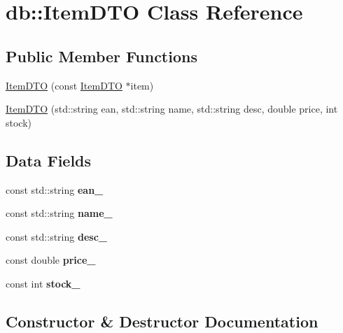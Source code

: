 \hypertarget{classdb_1_1ItemDTO}{}\section{db\+:\+:Item\+D\+TO Class Reference}
\label{classdb_1_1ItemDTO}
\subsection*{Public Member Functions}
\begin{DoxyCompactItemize}
\item 
\mbox{\hyperlink{classdb_1_1ItemDTO_a93543079a408eedb1978d0faad80a39d}{Item\+D\+TO}} (const \mbox{\hyperlink{classdb_1_1ItemDTO}{Item\+D\+TO}} $\ast$item)
\item 
\mbox{\hyperlink{classdb_1_1ItemDTO_a0769007cb2c7fa59e9cd61b577a3129c}{Item\+D\+TO}} (std\+::string ean, std\+::string name, std\+::string desc, double price, int stock)
\end{DoxyCompactItemize}
\subsection*{Data Fields}
\begin{DoxyCompactItemize}
\item 
\mbox{\label{classdb_1_1ItemDTO_ac73b629b12d6447ba069783cd2f9501c}} 
const std\+::string {\bfseries ean\+\_\+}
\item 
\mbox{\label{classdb_1_1ItemDTO_a3e1a945e6d7b7de9af505b2f310aad20}} 
const std\+::string {\bfseries name\+\_\+}
\item 
\mbox{\label{classdb_1_1ItemDTO_a5c09e91c2cf90e33b4f05ab945801111}} 
const std\+::string {\bfseries desc\+\_\+}
\item 
\mbox{\label{classdb_1_1ItemDTO_abd7ef017b071238714aa0b6a09d94a89}} 
const double {\bfseries price\+\_\+}
\item 
\mbox{\label{classdb_1_1ItemDTO_ad885ab01cd303bbf0c7b4fe9d0e13d46}} 
const int {\bfseries stock\+\_\+}
\end{DoxyCompactItemize}


\subsection{Constructor \& Destructor Documentation}
\mbox{\label{classdb_1_1ItemDTO_a93543079a408eedb1978d0faad80a39d}} 
